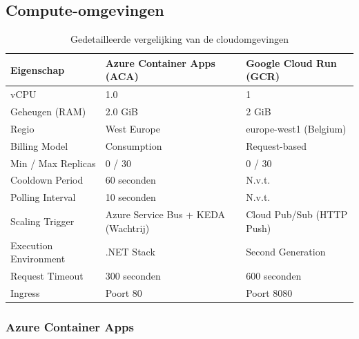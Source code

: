 \subsection{Compute-omgevingen}

\begin{table}[h]
    \centering
    \caption{Gedetailleerde vergelijking van de cloudomgevingen}
    \label{tab:compute-specs}
    \begin{tabular}{|l|l|l|}
        \hline
        \textbf{Eigenschap}        & \textbf{Azure Container Apps (ACA)} & \textbf{Google Cloud Run (GCR)} \\ \hline
        vCPU                       & 1.0                                 & 1                               \\ \hline
        Geheugen (RAM)             & 2.0 GiB                             & 2 GiB                           \\ \hline
        Regio                      & West Europe                         & europe-west1 (Belgium)          \\ \hline
        Billing Model              & Consumption                         & Request-based                  \\ \hline
        Min / Max Replicas         & 0 / 30                              & 0 / 30                          \\ \hline
        Cooldown Period            & 60 seconden                         & N.v.t.                          \\ \hline
        Polling Interval           & 10 seconden                         & N.v.t.                          \\ \hline  
        Scaling Trigger            & Azure Service Bus + KEDA (Wachtrij) & Cloud Pub/Sub (HTTP Push)       \\ \hline
        Execution Environment      & .NET Stack                          & Second Generation               \\ \hline
        Request Timeout            & 300 seconden                        & 600 seconden                    \\ \hline
        Ingress                    & Poort 80                            & Poort 8080                      \\ \hline
    \end{tabular}
\end{table}

\subsubsection*{Azure Container Apps}

